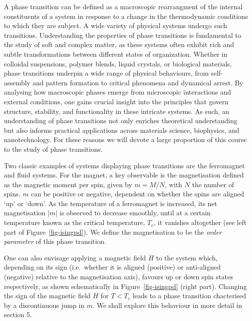 \documentclass[
  letterpaper,
  DIV=11,
  numbers=noendperiod]{scrreprt}
\begin{document}
A phase transition can be defined as a macroscopic rearrangment of the
internal constituents of a system in response to a change in the
thermodynamic conditions to which they are subject. A wide variety of
physical systems undergo such transitions. Understanding the properties
of phase transitions is fundamental to the study of soft and complex
matter, as these systems often exhibit rich and subtle transformations
between different states of organization. Whether in colloidal
suspensions, polymer blends, liquid crystals, or biological materials,
phase transitions underpin a wide range of physical behaviours, from
self-assembly and pattern formation to critical phenomena and dynamical
arrest. By analysing how macroscopic phases emerge from microscopic
interactions and external conditions, one gains crucial insight into the
principles that govern structure, stability, and functionality in these
intricate systems. As such, an understanding of phase transitions not
only enriches theoretical understanding but also informs practical
applications across materials science, biophysics, and nanotechnology.
For these reasons we will devote a large proportion of this course to
the study of phase transitions.

Two classic examples of systems displaying phase transitions are the
ferromagnet and fluid systems. For the magnet, a key observable is the
magnetisation defined as the magnetic moment per spin, given by
\(m=M/N\), with \(N\) the number of spins. \(m\) can be positive or
negative, dependent on whether the spins are aligned `up' or `down'. As
the temperature of a ferromagnet is increased, its net magnetisation
\(|m|\) is observed to decrease smoothly, until at a certain temperature
known as the critical temperature, \(T_c\), it vanishes altogether (see
left part of Figure~\ref{fig-isingpd}). We define the magnetisation to
be the \emph{order parameter} of this phase transition.

One can also envisage applying a magnetic field \(H\) to the system
which, depending on its sign (i.e.~whether it is aligned (positive) or
anti-aligned (negative) relative to the magnetisation axis), favours up
or down spin states respectively, as shown schematically in
Figure~\ref{fig-isingpd} (right part). Changing the sign of the magnetic
field \(H\) for \(T<T_c\) leads to a phase transition chacterised by a
discontinuous jump in \(m\). We shall explore this behaviour in more
detail in section 5.
\end{document}
